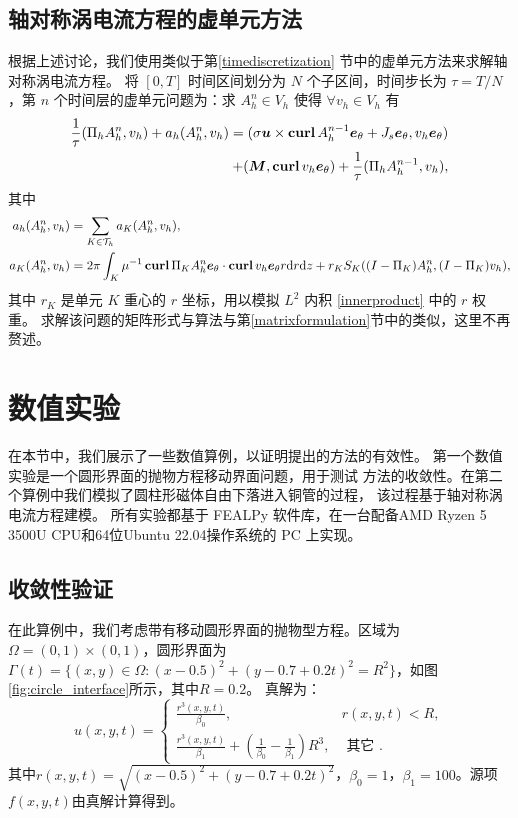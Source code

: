 \subsection{轴对称涡电流方程的虚单元方法}
根据上述讨论，我们使用类似于第\ref{timediscretization}
节中的虚单元方法来求解轴对称涡电流方程。
将 $[0, T]$ 时间区间划分为 $N$ 个子区间，时间步长为 $\tau = T/N$，第
$n$ 个时间层的虚单元问题为：求 $A_h^n \in V_h$ 使得 
$\forall v_h \in V_h$ 有
\begin{equation}
\label{vemaxial}
\begin{aligned}
\frac{1}{\tau}
(\Pi_h A_h^n, v_h) + 
a_h(A_h^n, v_h) = (\sigma\boldsymbol{u}\times \operatorname{\textbf{curl}} A_h^{n-1} \boldsymbol{e}_{\theta} +
    J_s\boldsymbol{e}_{\theta}, v_h\boldsymbol{e}_{\theta}) \\+ 
(\boldsymbol{M}, \operatorname{\textbf{curl}} v_h\boldsymbol{e}_{\theta})
+ \frac{1}{\tau}(\Pi_h A_h^{n-1}, v_h),
\end{aligned}
\end{equation}
其中
$$
\begin{aligned}
    a_h(A_h^n, v_h) & = \sum_{K\in \mathcal{T}_h} a_K(A^n_h, v_h),\\
    a_K(A^n_h, v_h) & = 2\pi\int_{K} \mu^{-1}\operatorname{\textbf{curl}}
\Pi_K A_h^n\boldsymbol{e}_{\theta}\cdot\operatorname{\textbf{curl}} v_h\boldsymbol{e}_{\theta} r \mathrm{ d} r \mathrm{ d} z
+ r_KS_K((I-\Pi_K)A_h^n, (I-\Pi_K)v_h),
\end{aligned}
$$
其中 $r_K$ 是单元 $K$ 重心的 $r$ 坐标，用以模拟 $L^2$ 内积
\eqref{innerproduct} 中的 $r$ 权重。
求解该问题的矩阵形式与算法与第\ref{matrixformulation}节中的类似，这里不再赘述。

\section{数值实验}
在本节中，我们展示了一些数值算例，以证明提出的方法的有效性。%
第一个数值实验是一个圆形界面的抛物方程移动界面问题，用于测试
方法的收敛性。在第二个算例中我们模拟了圆柱形磁体自由下落进入铜管的过程，
该过程基于轴对称涡电流方程建模。
所有实验都基于 FEALPy 软件库\cite{fealpy}，在一台配备AMD
Ryzen 5 3500U CPU和64位Ubuntu 22.04操作系统的 PC 上实现。

\subsection{收敛性验证}
\label{sec:circle_interface}
在此算例中，我们考虑带有移动圆形界面的抛物型方程。区域为$\Omega = (0,1) \times
(0,1)$，圆形界面为$\Gamma(t) = \{(x,y)\in \Omega: (x-0.5)^2 + (y-0.7+0.2t)^2 =
R^2\}$，如图\ref{fig:circle_interface}所示，其中$R=0.2$。
真解为：
\begin{equation}
  u(x,y,t) = \left\{
    \begin{matrix}
        \frac{r^3(x, y, t)}{\beta_0}, &  r(x, y, t) < R,\\
        \frac{r^3(x, y, t)}{\beta_1} + \left(\frac{1}{\beta_0} -
        \frac{1}{\beta_1}\right)R^3, & \text{ 其它 }.
    \end{matrix}
    \right.
\end{equation}
其中$r(x, y, t) = \sqrt{(x-0.5)^2 + (y-0.7+0.2t)^2}$，$\beta_0 = 1$，$\beta_1 = 100$。源项$f(x,y,t)$由真解计算得到。

